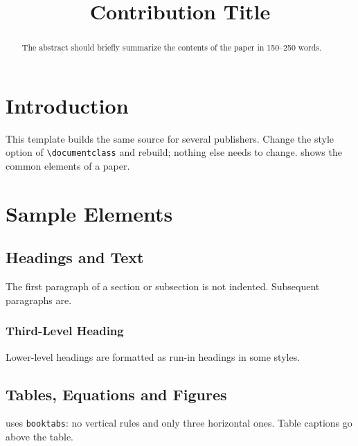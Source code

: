 \documentclass[
  lncs,         %
]{venue}
\title[Abbreviated Title for Running Heads]{Contribution Title}
\begin{document}
\begin{abstract}
  The abstract should briefly summarize the contents of the paper in
  150--250 words.
\end{abstract}

\maketitle

\section{Introduction}
\label{sec:intro}

This template builds the same source for several publishers.  Change the
style option of \verb|\documentclass| and rebuild; nothing else needs to
change.   shows the common elements of a paper.

\section{Sample Elements}
\label{sec:samples}

\subsection{Headings and Text}

The first paragraph of a section or subsection is not indented.  Subsequent
paragraphs are.

\subsubsection{Third-Level Heading}
Lower-level headings are formatted as run-in headings in some styles.

\subsection{Tables, Equations and Figures}

 uses \texttt{booktabs}: no vertical rules and only three
horizontal ones.  Table captions go above the table.
\end{document}
